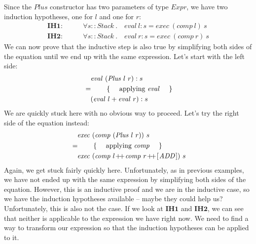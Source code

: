 Since the $\mathit{Plus}$ constructor has two parameters of type $\mathit{Expr}$, we have two induction hypotheses, one for $l$ and one for $r$:
\begin{displaymath}
\begin{array}{ll}
\mathbf{IH1}: \qquad & \forall s :: \mathit{Stack}~.\quad \mathit{eval}~l : s = \mathit{exec}~(\mathit{comp}~l)~s \\
\mathbf{IH2}: \qquad & \forall s :: \mathit{Stack}~.\quad \mathit{eval}~r : s = \mathit{exec}~(\mathit{comp}~r)~s 
\end{array}
\end{displaymath}
We can now prove that the inductive step is also true by simplifying both sides of the equation until we end up with the same expression. Let's start with the left side:
\begin{align*}
&\quad \mathit{eval}~(\mathit{Plus}~l~r) : s\\
&=\qquad\text{\{\quad\ applying $\mathit{eval}$ \quad\}}\\
&\quad (\mathit{eval}~l + \mathit{eval}~r) : s
\end{align*}
We are quickly stuck here with no obvious way to proceed. Let's try the right side of the equation instead:
\begin{align*}
\expr{\mathit{exec}~(\mathit{comp}~(\mathit{Plus}~l~r))~s}
\hint{applying $\mathit{comp}$}
\lastexpr{\mathit{exec}~(\mathit{comp}~l \append \mathit{comp}~r \append \hslist{\mathit{ADD}})~s}
\end{align*}
Again, we get stuck fairly quickly here. Unfortunately, as in previous examples, we have not ended up with the same expression by simplifying both sides of the equation. However, this is an inductive proof and we are in the inductive case, so we have the induction hypotheses available -- maybe they could help us? Unfortunately, this is also not the case. If we look at $\mathbf{IH1}$ and $\mathbf{IH2}$, we can see that neither is applicable to the expression we have right now. We need to find a way to transform our expression so that the induction hypotheses can be applied to it.

